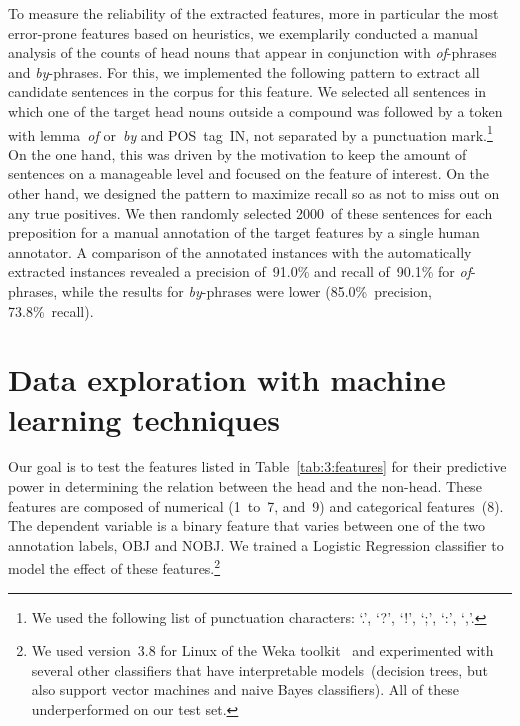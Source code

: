 \documentclass[output=paper]{langsci/langscibook}
\begin{document}
To measure the reliability of the extracted features,  {more in particular the most error-prone features based on heuristics,} we exemplarily conducted a manual analysis of the counts of head nouns that appear in conjunction with \textit{of}-phrases and \textit{by}-phrases. For this, we implemented the following pattern to extract all candidate sentences in the corpus for this feature. We selected all sentences in which one of the target head nouns outside a compound was followed by a token with lemma~\textit{of} or~\textit{by} and POS~tag~IN, not separated by a punctuation mark.\footnote{We used the following list of punctuation characters: \lq.\rq, \lq?\rq, \lq!\rq, \lq;\rq, \lq:\rq, \lq,\rq.} On the one hand, this was driven by the motivation to keep the amount of sentences on a manageable level and focused on the feature of interest.
On the other hand, we designed the pattern to maximize recall so as not to miss out on any true positives. We then randomly selected 2000~of these sentences for each preposition for a manual annotation of the target features by a single human annotator. A comparison of the annotated instances with the automatically extracted instances revealed a precision of~91.0\% 
 and recall of~90.1\%  
  for \textit{of}-phrases, while the results for \textit{by}-phrases were lower (85.0\%~precision, 
73.8\%~recall).



\section{Data exploration with machine learning techniques}\label{sec:ML}

Our goal is to test the features listed in Table~\ref{tab:3:features}  for their predictive power in determining the relation between the head and the non-head. These features are composed of numerical (1~to~7, and~9) and categorical features~(8).
The dependent variable is a  {binary} feature that varies between one of the two annotation labels, OBJ and NOBJ. We trained a Logistic Regression classifier to model the effect of these features.\footnote{We used version~3.8 for Linux of the Weka toolkit~\citep{Weka:09} and experimented with several other classifiers that have interpretable models~(decision trees, but also support vector machines and naive Bayes  {classifiers}). All of these underperformed on our test set.} 
\end{document}
